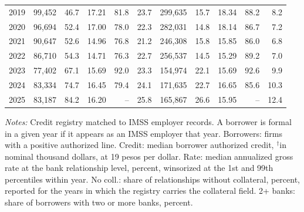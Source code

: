 \documentclass[12pt]{article}
\begin{document}
\begin{table}[htbp]
\begin{threeparttable}
\begin{tabular}{l r r r r r r r r r r}
            2019 & 99,452 & 46.7 & 17.21 & 81.8 & 23.7 & 299,635 & 15.7 & 18.34 & 88.2 & 8.2 \\
            2020 & 96,694 & 52.4 & 17.00 & 78.0 & 22.3 & 282,031 & 14.8 & 18.14 & 86.7 & 7.2 \\
            2021 & 90,647 & 52.6 & 14.96 & 76.8 & 21.2 & 246,308 & 15.8 & 15.85 & 86.0 & 6.8 \\
            2022 & 86,710 & 54.3 & 14.71 & 76.3 & 22.7 & 256,537 & 14.5 & 15.29 & 89.2 & 7.0 \\
            2023 & 77,402 & 67.1 & 15.69 & 92.0 & 23.3 & 154,974 & 22.1 & 15.69 & 92.6 & 9.9 \\
            2024 & 83,334 & 74.7 & 16.45 & 79.4 & 24.1 & 171,635 & 22.7 & 16.65 & 85.6 & 10.3 \\
            2025 & 83,187 & 84.2 & 16.20 & -- & 25.8 & 165,867 & 26.6 & 15.95 & -- & 12.4 \\
            \bottomrule
        \end{tabular}
        \begin{tablenotes}[flushleft]
            \footnotesize
            \item \textit{Notes:} Credit registry matched to IMSS employer records. A borrower is formal in a given year if it appears as an IMSS employer that year. Borrowers: firms with a positive authorized line. Credit: median borrower authorized credit, $^{\dagger}$in nominal thousand dollars, at 19 pesos per dollar. Rate: median annualized gross rate at the bank relationship level, percent, winsorized at the 1st and 99th percentiles within year. No coll.: share of relationships without collateral, percent, reported for the years in which the registry carries the collateral field. 2+ banks: share of borrowers with two or more banks, percent. 
        \end{tablenotes}
    \end{threeparttable}
\end{table}
\end{document}
